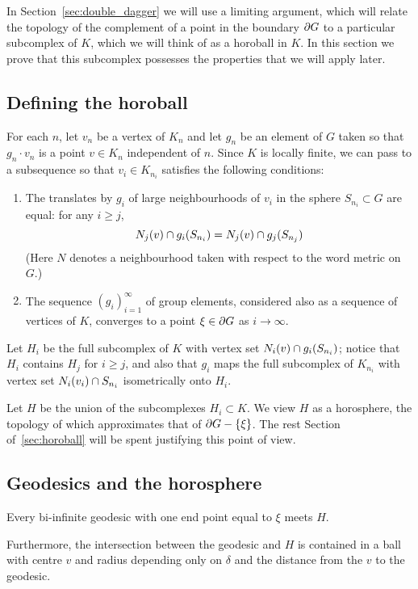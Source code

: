 \documentclass[a4paper]{article}
\begin{document}
In Section~\ref{sec:double_dagger} we will use a limiting argument, which will
relate the topology of the complement of a point in the boundary $\partial G$
to a particular subcomplex of $K$, which we will think of as a horoball in $K$.
In this section we prove that this subcomplex possesses the properties that we
will apply later.

\subsection{Defining the horoball}

For each $n$, let $v_n$ be a vertex of $K_n$ and let $g_n$ be an element of $G$
taken so that $g_n\cdot v_n$ is a point $v \in K_n$ independent of $n$.  Since
$K$ is locally finite, we can pass to a subsequence so that $v_i \in
K_{n_i}$ satisfies the following conditions:
\begin{enumerate}
  \item
    The translates by $g_i$ of large neighbourhoods of $v_i$ in the sphere
    $S_{n_i} \subset G$ are equal: for any $i \geq j$,
    \begin{equation*}
      N_j(v) \cap g_i(S_{n_i}) = N_j(v) \cap g_j(S_{n_j})
    \end{equation*}
    (Here $N$ denotes a neighbourhood taken with respect to the word metric on
    $G$.)
  \item
    The sequence $(g_i)_{i=1}^\infty$ of group elements, considered also as a
    sequence of vertices of $K$, converges to a point $\xi \in \partial G$ as
    $i\to\infty$.
\end{enumerate}

Let $H_i$ be the full subcomplex of $K$ with vertex set $N_i(v) \cap
g_i(S_{n_i})$; notice that $H_i$ contains $H_j$ for $i \geq j$, and also that
$g_i$ maps the full subcomplex of $K_{n_i}$ with vertex set $N_i(v_i)
\cap S_{n_i}$ isometrically onto $H_i$. 

Let $H$ be the union of the subcomplexes $H_i \subset K$. We view $H$ as a
horosphere, the topology of which approximates that of $\partial G - \left\{\xi\right\}$.
The rest Section of~\ref{sec:horoball} will be spent justifying this point of view.

\subsection{Geodesics and the horosphere}

\begin{lemma}\label{lem:nonempty_intersection}
  Every bi-infinite geodesic with one end point equal to $\xi$ meets $H$.
  
  Furthermore, the intersection between the geodesic and $H$ is contained in a
  ball with centre $v$ and radius depending only on $\delta$ and the distance
  from the $v$ to the geodesic.
\end{lemma}
\end{document}
